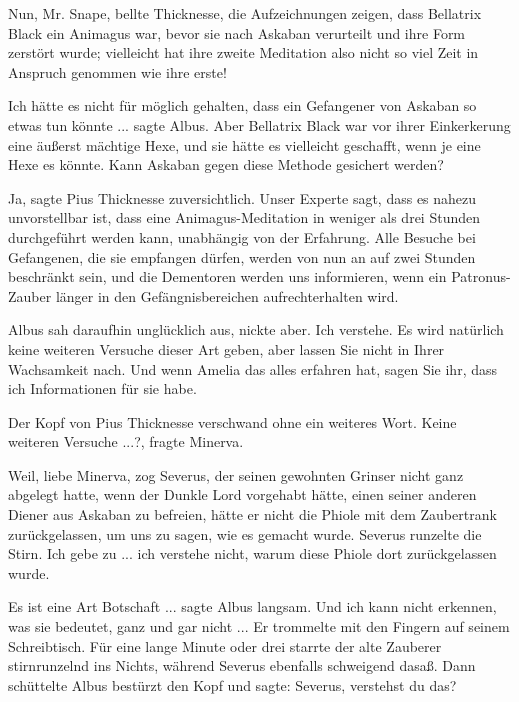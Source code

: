 \glqq Nun, Mr. Snape\grqq{}, bellte Thicknesse, \glqq die Aufzeichnungen zeigen,
dass Bellatrix Black ein Animagus war, bevor sie nach Askaban verurteilt und
ihre Form zerstört wurde; vielleicht hat ihre zweite Meditation also nicht so
viel Zeit in Anspruch genommen wie ihre erste!\grqq{}

\glqq Ich hätte es nicht für möglich gehalten, dass ein Gefangener von Askaban
so etwas tun könnte ...\grqq{} sagte Albus. \glqq Aber Bellatrix Black war vor
ihrer Einkerkerung eine äußerst mächtige Hexe, und sie hätte es vielleicht
geschafft, wenn je eine Hexe es könnte. Kann Askaban gegen diese Methode
gesichert werden?\grqq{}

\glqq Ja\grqq{}, sagte Pius Thicknesse zuversichtlich. \glqq Unser Experte sagt,
dass es nahezu unvorstellbar ist, dass eine Animagus-Meditation in weniger als
drei Stunden durchgeführt werden kann, unabhängig von der Erfahrung. Alle
Besuche bei Gefangenen, die sie empfangen dürfen, werden von nun an auf zwei
Stunden beschränkt sein, und die Dementoren werden uns informieren, wenn ein
Patronus-Zauber länger in den Gefängnisbereichen aufrechterhalten wird.\grqq{}

Albus sah daraufhin unglücklich aus, nickte aber. \glqq Ich verstehe. Es wird
natürlich keine weiteren Versuche dieser Art geben, aber lassen Sie nicht in
Ihrer Wachsamkeit nach. Und wenn Amelia das alles erfahren hat, sagen Sie ihr,
dass ich Informationen für sie habe.\grqq{}

Der Kopf von Pius Thicknesse verschwand ohne ein weiteres Wort. \glqq Keine
weiteren Versuche ...?\grqq{}, fragte Minerva.

\glqq Weil, liebe Minerva\grqq{}, zog Severus, der seinen gewohnten Grinser
nicht ganz abgelegt hatte, \glqq wenn der Dunkle Lord vorgehabt hätte, einen
seiner anderen Diener aus Askaban zu befreien, hätte er nicht die Phiole mit dem
Zaubertrank zurückgelassen, um uns zu sagen, wie es gemacht wurde.\grqq{}
Severus runzelte die Stirn. \glqq Ich gebe zu ... ich verstehe nicht, warum
diese Phiole dort zurückgelassen wurde.\grqq{}

\glqq Es ist eine Art Botschaft ...\grqq{} sagte Albus langsam. \glqq Und ich
kann nicht erkennen, was sie bedeutet, ganz und gar nicht ...\grqq{} Er
trommelte mit den Fingern auf seinem Schreibtisch. Für eine lange Minute oder
drei starrte der alte Zauberer stirnrunzelnd ins Nichts, während Severus
ebenfalls schweigend dasaß. Dann schüttelte Albus bestürzt den Kopf und sagte:
\glqq Severus, verstehst du das?\grqq{}

